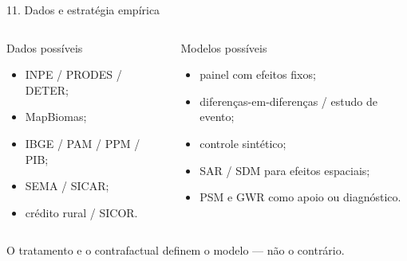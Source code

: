 \documentclass[aspectratio=169,11pt]{beamer}
\begin{document}
\begin{frame}{11. Dados e estratégia empírica}
  \begin{columns}[T,onlytextwidth]
      \begin{block}{Dados possíveis}
        \begin{itemize}
          \item INPE / PRODES / DETER;
          \item MapBiomas;
          \item IBGE / PAM / PPM / PIB;
          \item SEMA / SICAR;
          \item crédito rural / SICOR.
        \end{itemize}
      \end{block}

      \begin{block}{Modelos possíveis}
        \begin{itemize}
          \item painel com efeitos fixos;
          \item diferenças-em-diferenças / estudo de evento;
          \item controle sintético;
          \item SAR / SDM para efeitos espaciais;
          \item PSM e GWR como apoio ou diagnóstico.
        \end{itemize}
      \end{block}
  \end{columns}

  \vfill
  \centering
  O tratamento e o contrafactual definem o modelo — não o contrário.

\end{frame}
\end{document}
